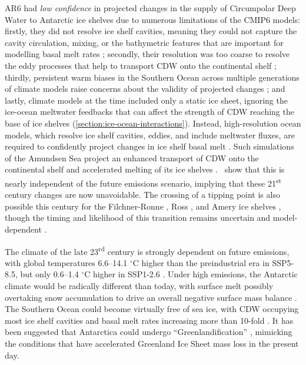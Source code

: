 AR6 had \textit{low confidence} in projected changes in the supply of Circumpolar Deep Water to Antarctic ice shelves due to numerous limitations of the CMIP6 models: firstly, they did not resolve ice shelf cavities, meaning they could not capture the cavity circulation, mixing, or the bathymetric features that are important for modelling basal melt rates \citep{burgardAssessmentBasalMelt2022}; secondly, their resolution was too coarse to resolve the eddy processes that help to transport CDW onto the continental shelf \citep{wangMultiscaleOceanicHeat2023}; thirdly, persistent warm biases in the Southern Ocean across multiple generations of climate models raise concerns about the validity of projected changes \citep{barthelCMIP5ModelSelection2020}; and lastly, climate models at the time included only a static ice sheet, ignoring the ice-ocean meltwater feedbacks that can affect the strength of CDW reaching the base of ice shelves (\cref{section:ice-ocean-interactions}). Instead, high-resolution ocean models, which resolve ice shelf cavities, eddies, and include meltwater fluxes, are required to confidently project changes in ice shelf basal melt \citep{yungResultsSecondIce2026}. Such simulations of the Amundsen Sea project an enhanced transport of CDW onto the continental shelf and accelerated melting of its ice shelves \citep{jourdainTwentyfirstCenturyProjections2022,naughtenUnavoidableFutureIncrease2023}.~\cite{naughtenUnavoidableFutureIncrease2023} show that this is nearly independent of the future emissions scenario, implying that these 21\textsuperscript{st} century changes are now unavoidable. The crossing of a tipping point is also possible this century for the Filchner-Ronne \citep{teskeSubsurfaceWarmingAntarcticas2024,songRegionalConditionsDetermine2025}, Ross \citep{jacobsPersistentRossSea2022,siahaanAntarcticContribution21stcentury2022}, and Amery ice shelves \citep{jinCurrentReversalLeads2025}, though the timing and likelihood of this transition remains uncertain and model-dependent \citep{naughtenTwotimescaleResponseLarge2021,comeauDOEE3SMV122022,kusaharaAntarcticSeaIce2023}.


The climate of the late 23\textsuperscript{rd} century is strongly dependent on future emissions, with global temperatures 6.6--14.1 $^\circ$C higher than the preindustrial era in SSP5-8.5, but only 0.6--1.4 $^\circ$C higher in SSP1-2.6 \citep{Lee2021_IPCC_WGI_Ch4}. Under high emissions, the Antarctic climate would be radically different than today, with surface melt possibly overtaking snow accumulation to drive an overall negative surface mass balance \citep{coulonDisentanglingDriversFuture2024}. The Southern Ocean could become virtually free of sea ice, with CDW occupying most ice shelf cavities and basal melt rates increasing more than 10-fold \citep{mathiotSouthernOceanWarming2023}. It has been suggested that Antarctica could undergo ``Greenlandification'' \citep{mottramGreenlandificationAntarctica2025}, mimicking the conditions that have accelerated Greenland Ice Sheet mass loss in the present day.


